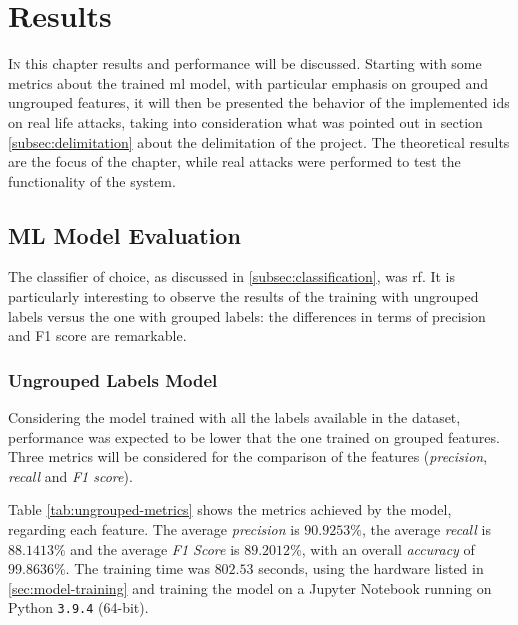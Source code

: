 \chapter{Results}
\label{chap:results}

\lettrine[lines=4, findent=3pt, nindent=0pt]{I}{n} this chapter results and performance will be discussed. Starting with some metrics about the trained \gls{ml} model, with particular emphasis on grouped and ungrouped features, it will then be presented the behavior of the implemented \gls{ids} on real life attacks, taking into consideration what was pointed out in section \ref{subsec:delimitation} about the delimitation of the project. The theoretical results are the focus of the chapter, while real attacks were performed to test the functionality of the system.

\section{ML Model Evaluation}
\label{sec:ml-model-evaluation}

The classifier of choice, as discussed in \ref{subsec:classification}, was \gls{rf}. It is particularly interesting to observe the results of the training with ungrouped labels versus the one with grouped labels: the differences in terms of precision and F1 score are remarkable.


\subsection{Ungrouped Labels Model}
\label{subsec:ungrouped-training}

Considering the model trained with all the labels available in the dataset, performance was expected to be lower that the one trained on grouped features. Three metrics will be considered for the comparison of the features (\textit{precision}, \textit{recall} and \textit{F1 score}).
\par Table \ref{tab:ungrouped-metrics} shows the metrics achieved by the model, regarding each feature. The average \textit{precision} is $90.9253\%$, the average \textit{recall} is $88.1413\%$ and the average \textit{F1 Score} is $89.2012\%$, with an overall \textit{accuracy} of $99.8636\%$. The training time was $802.53$ seconds, using the hardware listed in \ref{sec:model-training} and training the model on a Jupyter Notebook running on Python \texttt{3.9.4} (64-bit).

